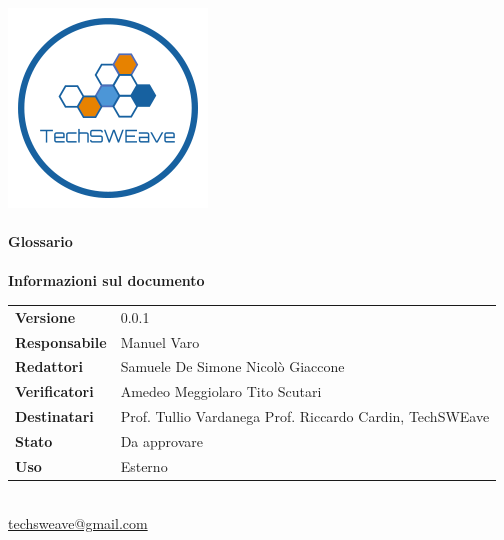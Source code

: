 \documentclass[a4paper]{article}
\begin{document}
\begin{titlepage}
    \begin{center}
        \includegraphics{../../../Images/logo}\\
        \vspace{20px}
        \textcolor{logo}{\hrulefill}\\
        \vspace{20px}
        \textbf{\huge\textcolor{logo}{Glossario}}\\
        \vspace{10px}
        \textcolor{logo}{\hrulefill}\\
        \vspace{40px}
        \textbf{\Large Informazioni sul documento}\\
        \vspace{20px}
        \begin{tabular}{p{100px} | p{100px}}
            \textbf{Versione}     & 0.0.1                                                                      \\
            \textbf{Responsabile} & Manuel Varo                                                                \\
            \textbf{Redattori}    & Samuele De Simone \newline Nicolò Giaccone                                 \\
            \textbf{Verificatori} & Amedeo Meggiolaro \newline Tito Scutari                                    \\
            \textbf{Destinatari}  & Prof. Tullio Vardanega \newline Prof. Riccardo Cardin, \newline TechSWEave \\
            \textbf{Stato}        & Da approvare                                                               \\
            \textbf{Uso}          & Esterno                                                                    \\
        \end{tabular}\\
        \vspace{60px}
        \href{mailto:techsweave@gmail.com}{techsweave@gmail.com}\\

    \end{center}
\end{titlepage}
\end{document}
